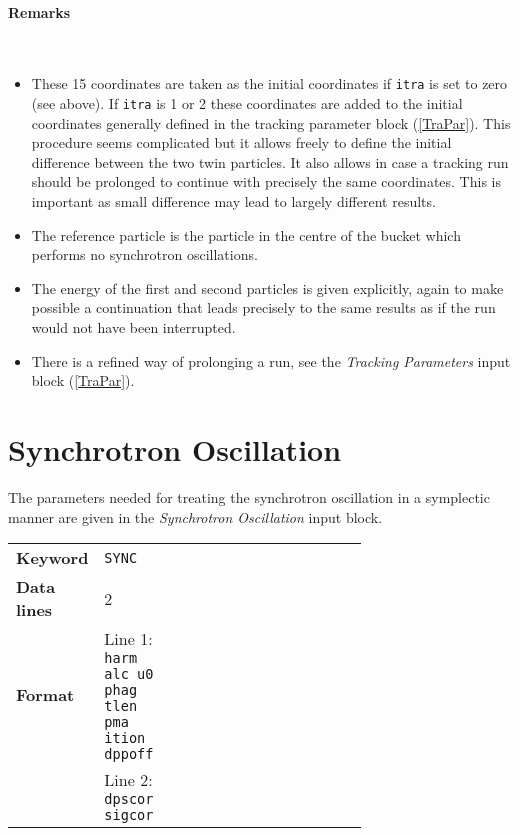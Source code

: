 \paragraph{Remarks}~
\begin{itemize}
    \item These 15 coordinates are taken as the initial coordinates if \texttt{itra} is set to zero (see above). If \texttt{itra} is 1 or 2 these coordinates are added to the initial coordinates generally defined in the tracking parameter block (\ref{TraPar}). This procedure seems complicated but it allows freely to define the initial difference between the two twin particles. It also allows in case a tracking run should be prolonged to continue with precisely the same coordinates. This is important as small difference may lead to largely different results.
    \item The reference particle is the particle in the centre of the bucket which performs no synchrotron oscillations.
    \item The energy of the first and second particles is given explicitly, again to make possible a continuation that leads precisely to the same results as if the run would not have been interrupted.
    \item There is a refined way of prolonging a run, see the \textit{Tracking Parameters} input block (\ref{TraPar}).
\end{itemize}

\section{Synchrotron Oscillation} \label{SynOsc}

The parameters needed for treating the synchrotron oscillation in a symplectic manner are given in the \textit{Synchrotron Oscillation} input block.

\bigskip
\begin{tabular}{@{}llp{0.7\linewidth}}
    \textbf{Keyword}    & \texttt{SYNC}\index{SYNC} \\
    \textbf{Data lines} & 2 \\
    \textbf{Format}     & Line 1: \texttt{harm alc u0 phag tlen pma ition dppoff} \\
                        & Line 2: \texttt{dpscor sigcor}
\end{tabular}

